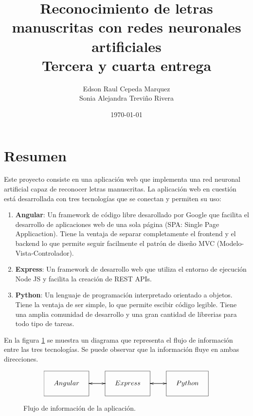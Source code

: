 \documentclass{article}
\title{
    Reconocimiento de letras manuscritas con redes neuronales artificiales\\ 
    \large Tercera y cuarta entrega}
\author{Edson Raul Cepeda Marquez \\ Sonia Alejandra Treviño Rivera}
\date{\today}
\begin{document}
\setlength{\parskip}{2mm}
\setlength{\parindent}{0pt}
\maketitle
\section{Resumen}\label{sec:Resumen}
Este proyecto consiste en una aplicación web que implementa una red neuronal artificial capaz 
de reconocer letras manuscritas. La aplicación web en cuestión está desarrollada con tres tecnologías 
que se conectan y permiten su uso:
\begin{enumerate}
    \item \textbf{Angular}: Un framework de código libre desarollado por Google que facilita el desarrollo de 
    aplicaciones web de una sola página (SPA: Single Page Applicaction). Tiene la ventaja de separar completamente el frontend y el backend lo que permite
    seguir facilmente el patrón de diseño MVC (Modelo-Vista-Controlador). 
    \item \textbf{Express}: Un framework de desarrollo web que utiliza el entorno de ejecución Node JS y facilita la creación de REST APIs.
    \item \textbf{Python}: Un lenguaje de programación interpretado orientado a objetos. Tiene la ventaja de ser simple, lo que permite escibir código legible.
    Tiene una amplia comunidad de desarrollo y una gran cantidad de librerias para todo tipo de tareas.
\end{enumerate}
En la figura \ref{flujo} se muestra un diagrama que representa el flujo de información entre las tres tecnologías. Se puede observar que la información fluye en ambas direcciones. 
\begin{figure}[H]
    \begin{displaymath}
        \xymatrix{*+<1cm>[F]{Angular} \ar[r] & *+<1cm>[F]{Express} \ar[l] \ar[r] & *+<1cm>[F]{Python} \ar[l]}
    \end{displaymath}
    \caption{Flujo de información de la aplicación.}
    \label{flujo} 
\end{figure}
\end{document}
